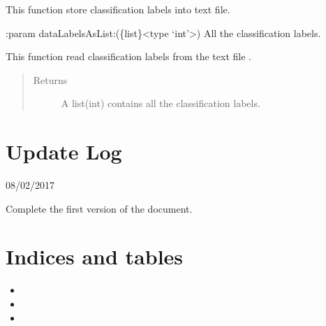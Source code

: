 \documentclass[letterpaper,10pt,english]{sphinxmanual}
\begin{document}
\begin{fulllineitems}
\label{Documentation of Code:dataSet.utilText.SaveLabels}
This function store classification labels into text file.

:param dataLabelsAsList:(\{list\}\textless{}type `int'\textgreater{}) All the classification labels.

\end{fulllineitems}


\begin{fulllineitems}
\label{Documentation of Code:dataSet.utilText.ReadLabels}
This function read classification labels from the text file .
\begin{quote}\begin{description}
\item[{Returns}] \leavevmode
A list(int) contains all the classification labels.

\end{description}\end{quote}

\end{fulllineitems}



\chapter{Update Log}
\label{UpdateLog:update-log}\label{UpdateLog::doc}
08/02/2017

Complete the first version of the document.


\chapter{Indices and tables}
\label{index:indices-and-tables}\begin{itemize}
\item {} 

\item {} 

\item {} 

\end{itemize}
\end{document}
